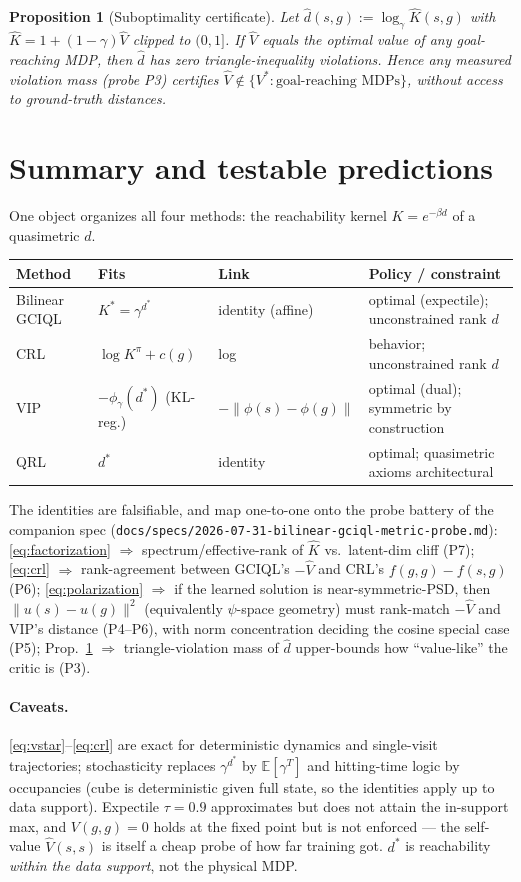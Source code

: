 \documentclass[10pt]{article}
\newtheorem{proposition}{Proposition}
\newcommand{\E}{\mathbb{E}}
\begin{document}
\begin{proposition}[Suboptimality certificate]\label{prop:cert}
Let $\hat d(s,g) := \log_\gamma \hat K(s,g)$ with $\hat K = 1 + (1-\gamma)\hat V$ clipped to $(0,1]$. If $\hat V$ equals the optimal value of \emph{any} goal-reaching MDP, then $\hat d$ has zero triangle-inequality violations. Hence any measured violation mass (probe P3) certifies $\hat V \notin \{V^* : \text{goal-reaching MDPs}\}$, without access to ground-truth distances.
\end{proposition}

\section{Summary and testable predictions}

One object organizes all four methods: the reachability kernel $K = e^{-\beta d}$ of a quasimetric $d$.
\begin{center}
\begin{tabular}{l l l l}
\hline
Method & Fits & Link & Policy / constraint \\
\hline
Bilinear GCIQL & $K^* = \gamma^{d^*}$ & identity (affine) & optimal (expectile); unconstrained rank $d$ \\
CRL & $\log K^{\pi} + c(g)$ & log & behavior; unconstrained rank $d$ \\
VIP & $-\phi_\gamma(d^*)$ (KL-reg.) & $-\lVert\phi(s)-\phi(g)\rVert$ & optimal (dual); symmetric by construction \\
QRL & $d^*$ & identity & optimal; quasimetric axioms architectural \\
\hline
\end{tabular}
\end{center}
The identities are falsifiable, and map one-to-one onto the probe battery of the companion spec (\texttt{docs/specs/2026-07-31-bilinear-gciql-metric-probe.md}): \eqref{eq:factorization} $\Rightarrow$ spectrum/effective-rank of $\hat K$ vs.\ latent-dim cliff (P7); \eqref{eq:crl} $\Rightarrow$ rank-agreement between GCIQL's $-\hat V$ and CRL's $f(g,g)-f(s,g)$ (P6); \eqref{eq:polarization} $\Rightarrow$ if the learned solution is near-symmetric-PSD, then $\lVert u(s)-u(g)\rVert^2$ (equivalently $\psi$-space geometry) must rank-match $-\hat V$ and VIP's distance (P4--P6), with norm concentration deciding the cosine special case (P5); Prop.~\ref{prop:cert} $\Rightarrow$ triangle-violation mass of $\hat d$ upper-bounds how ``value-like'' the critic is (P3).

\paragraph{Caveats.} \eqref{eq:vstar}--\eqref{eq:crl} are exact for deterministic dynamics and single-visit trajectories; stochasticity replaces $\gamma^{d^*}$ by $\E[\gamma^{T}]$ and hitting-time logic by occupancies (cube is deterministic given full state, so the identities apply up to data support). Expectile $\tau=0.9$ approximates but does not attain the in-support max, and $V(g,g)=0$ holds at the fixed point but is not enforced --- the self-value $\hat V(s,s)$ is itself a cheap probe of how far training got. $d^*$ is reachability \emph{within the data support}, not the physical MDP.
\end{document}
